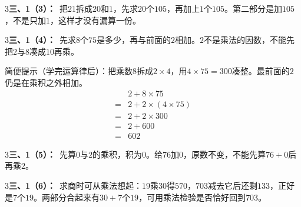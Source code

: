 \documentclass[multi=snippet,border={5bp 20bp 5bp 5bp}]{standalone}
\newenvironment{snippet}[3]{\begin{minipage}{#1bp}\color{answerred}\fontsize{#2}{#3}\selectfont\raggedright}{\end{minipage}}
\begin{document}
\begin{snippet}{505}{11.5}{14}\begin{multicols}{3}\raggedcolumns \textbf{三、1（3）：}\ 把\(21\)\allowbreak 拆成\(20\)\allowbreak 和\(1\)\allowbreak ，先求\(20\)\allowbreak 个\(105\)\allowbreak ，再加上\(1\)\allowbreak 个\(105\)\allowbreak 。第二部分是加\(105\)\allowbreak ，不是只加\(1\)\allowbreak ，这样才没有漏算一份。\end{multicols}\end{snippet}
\begin{snippet}{505}{11.5}{14}\begin{multicols}{3}\raggedcolumns \textbf{三、1（4）：}\ 先求\(8\)\allowbreak 个\(75\)\allowbreak 是多少，再与前面的\(2\)\allowbreak 相加。\(2\)\allowbreak 不是乘法的因数，不能先把\(2\)\allowbreak 与\(8\)\allowbreak 凑成\(10\)\allowbreak 再乘。\par 简便提示（学完运算律后）：把乘数\(8\)\allowbreak 拆成\(2\times4\)\allowbreak ，用\(4\times75=300\)\allowbreak 凑整。最前面的\(2\)\allowbreak 仍是在乘积之外相加。\[\begin{aligned}&2+8\times75\\={}&2+2\times(4\times75)\\={}&2+2\times300\\={}&2+600\\={}&602\end{aligned}\]\end{multicols}\end{snippet}
\begin{snippet}{505}{11.5}{14}\begin{multicols}{3}\raggedcolumns \textbf{三、1（5）：}\ 先算\(0\)\allowbreak 与\(2\)\allowbreak 的乘积，积为\(0\)\allowbreak 。给\(76\)\allowbreak 加\(0\)\allowbreak ，原数不变，不能先算\(76+0\)\allowbreak 后再乘\(2\)\allowbreak 。\end{multicols}\end{snippet}
\begin{snippet}{505}{11.5}{14}\begin{multicols}{3}\raggedcolumns \textbf{三、1（6）：}\ 求商时可从乘法想起：\(19\)\allowbreak 乘\(30\)\allowbreak 得\(570\)\allowbreak ，\(703\)\allowbreak 减去它后还剩\(133\)\allowbreak ，正好是\(7\)\allowbreak 个\(19\)\allowbreak 。两部分合起来有\(30+7\)\allowbreak 个\(19\)\allowbreak ，可用乘法检验是否恰好回到\(703\)\allowbreak 。\end{multicols}\end{snippet}
\end{document}
